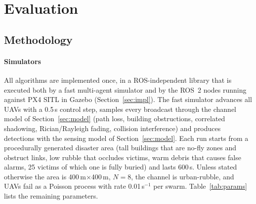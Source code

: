 \section{Evaluation}\label{sec:eval}

\subsection{Methodology}\label{sec:eval:method}
\paragraph{Simulators}
All algorithms are implemented once, in a ROS-independent library that is executed both by a fast
multi-agent simulator and by the ROS~2 nodes running against PX4 SITL in Gazebo
(Section~\ref{sec:impl}). The fast simulator advances all UAVs with a 0.5\,s control step, samples
every broadcast through the channel model of Section~\ref{sec:model} (path loss, building
obstructions, correlated shadowing, Rician/Rayleigh fading, collision interference) and produces
detections with the sensing model of Section~\ref{sec:model}. Each run starts from a procedurally generated
disaster area (tall buildings that are no-fly zones and obstruct links, low rubble that occludes
victims, warm debris that causes false alarms, 25 victims of which one is fully buried) and lasts
600\,s. Unless stated otherwise the area is 400\,m$\times$400\,m, $N=8$, the channel is
urban-rubble, and UAVs fail as a Poisson process with rate 0.01\,s$^{-1}$ per swarm.
Table~\ref{tab:params} lists the remaining parameters.

